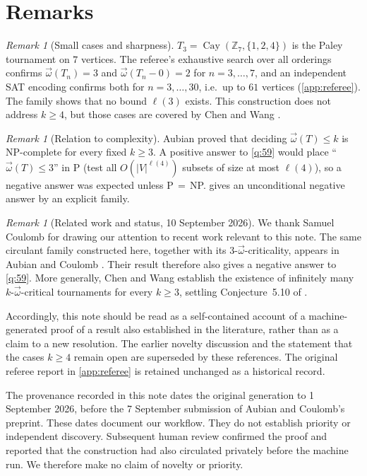 \documentclass[11pt,a4paper]{article}
\theoremstyle{plain}
\theoremstyle{definition}
\theoremstyle{remark}
\newtheorem{remark}[theorem]{Remark}
\newcommand{\cl}{\overrightarrow{\omega}}
\newcommand{\Z}{\mathbb Z}
\newcommand{\Cay}{\operatorname{Cay}}
\begin{document}
\section{Remarks}

\begin{remark}[Small cases and sharpness]
$T_3=\Cay(\Z_7,\{1,2,4\})$ is the Paley tournament on $7$ vertices. The referee's exhaustive search over all orderings confirms $\cl(T_n)=3$ and $\cl(T_n-0)=2$ for $n=3,\dots,7$, and an independent SAT encoding confirms both for $n=3,\dots,30$, i.e.\ up to $61$ vertices (\cref{app:referee}). The family shows that no bound $\ell(3)$ exists. This construction does not address $k\ge4$, but those cases are covered by Chen and Wang \cite[Theorem~1.1]{CW26}.
\end{remark}

\begin{remark}[Relation to complexity]
Aubian \cite{Aubian24} proved that deciding $\cl(T)\le k$ is NP-complete for every fixed $k\ge3$. A positive answer to \cref{q:59} would place ``$\cl(T)\le3$'' in P (test all $O(|V|^{\ell(4)})$ subsets of size at most $\ell(4)$), so a negative answer was expected unless P\,$=$\,NP.  gives an unconditional negative answer by an explicit family.
\end{remark}

\begin{remark}[Related work and status, 10 September 2026]
We thank Samuel Coulomb for drawing our attention to recent work relevant to this note. The same circulant family constructed here, together with its $3$-$\cl$-criticality, appears in Aubian and Coulomb \cite[6.1]{AC26}. Their result therefore also gives a negative answer to \cref{q:59}. More generally, Chen and Wang \cite[Theorem~1.1]{CW26} establish the existence of infinitely many $k$-$\cl$-critical tournaments for every $k\ge3$, settling Conjecture~5.10 of \cite{AACL23}.

Accordingly, this note should be read as a self-contained account of a machine-generated proof of a result also established in the literature, rather than as a claim to a new resolution. The earlier novelty discussion and the statement that the cases $k\ge4$ remain open are superseded by these references. The original referee report in \cref{app:referee} is retained unchanged as a historical record.

The provenance recorded in this note dates the original generation to 1 September 2026, before the 7 September submission of Aubian and Coulomb's preprint. These dates document our workflow. They do not establish priority or independent discovery. Subsequent human review confirmed the proof and reported that the construction had also circulated privately before the machine run. We therefore make no claim of novelty or priority.
\end{remark}
\end{document}
